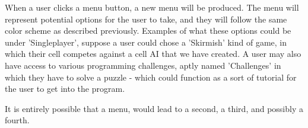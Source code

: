 When a user clicks a menu button, a new menu will be produced.
The menu will represent potential options for the user to take, and they will follow the same color scheme as described previously. 
Examples of what these options could be under 'Singleplayer', suppose a user could chose a 'Skirmish' kind of 
game, in which their cell competes against a cell AI that we have created.
A user may also have access to various programming challenges, aptly named 'Challenges' in which they have to solve a puzzle - which could function as a sort of tutorial for the user to get into the program.\newline

It is entirely possible that a menu, would lead to a second, a third, and possibly a fourth.